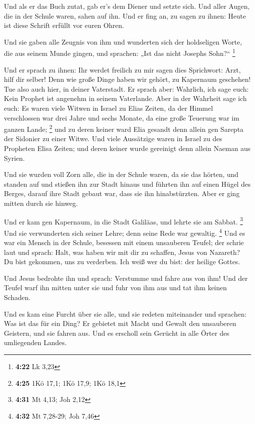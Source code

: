  Und als er das Buch zutat, gab er's dem Diener und setzte
sich. Und aller Augen, die in der Schule waren, sahen auf ihn.
 Und er fing an, zu sagen zu ihnen: Heute ist diese Schrift
erfüllt vor euren Ohren.

 Und sie gaben alle Zeugnis von ihm und wunderten sich der
holdseligen Worte, die aus seinem Munde gingen, und sprachen: „Ist das
nicht Josephs Sohn?{}`` \footnote{\textbf{4:22} Lk 3,23}

 Und er sprach zu ihnen: Ihr werdet freilich zu mir sagen
dies Sprichwort: Arzt, hilf dir selber! Denn wie große Dinge haben wir
gehört, zu Kapernaum geschehen! Tue also auch hier, in deiner
Vaterstadt.  Er sprach aber: Wahrlich, ich sage euch: Kein
Prophet ist angenehm in seinem Vaterlande.  Aber in der
Wahrheit sage ich euch: Es waren viele Witwen in Israel zu Elias Zeiten,
da der Himmel verschlossen war drei Jahre und sechs Monate, da eine
große Teuerung war im ganzen Lande; \footnote{\textbf{4:25} 1Kö 17,1;
  1Kö 17,9; 1Kö 18,1}  und zu deren keiner ward Elia
gesandt denn allein gen Sarepta der Sidonier zu einer Witwe.
 Und viele Aussätzige waren in Israel zu des Propheten
Elisa Zeiten; und deren keiner wurde gereinigt denn allein Naeman aus
Syrien.

 Und sie wurden voll Zorn alle, die in der Schule waren, da
sie das hörten,  und standen auf und stießen ihn zur Stadt
hinaus und führten ihn auf einen Hügel des Berges, darauf ihre Stadt
gebaut war, dass sie ihn hinabstürzten.  Aber er ging
mitten durch sie hinweg.

 Und er kam gen Kapernaum, in die Stadt Galiläas, und
lehrte sie am Sabbat. \footnote{\textbf{4:31} Mt 4,13; Joh 2,12}
 Und sie verwunderten sich seiner Lehre; denn seine Rede
war gewaltig. \footnote{\textbf{4:32} Mt 7,28-29; Joh 7,46}
 Und es war ein Mensch in der Schule, besessen mit einem
unsauberen Teufel; der schrie laut  und sprach: Halt, was
haben wir mit dir zu schaffen, Jesus von Nazareth? Du bist gekommen, uns
zu verderben. Ich weiß wer du bist: der heilige Gottes.

 Und Jesus bedrohte ihn und sprach: Verstumme und fahre aus
von ihm! Und der Teufel warf ihn mitten unter sie und fuhr von ihm aus
und tat ihm keinen Schaden.

 Und es kam eine Furcht über sie alle, und sie redeten
miteinander und sprachen: Was ist das für ein Ding? Er gebietet mit
Macht und Gewalt den unsauberen Geistern, und sie fahren aus.
 Und es erscholl sein Gerücht in alle Örter des umliegenden
Landes.

